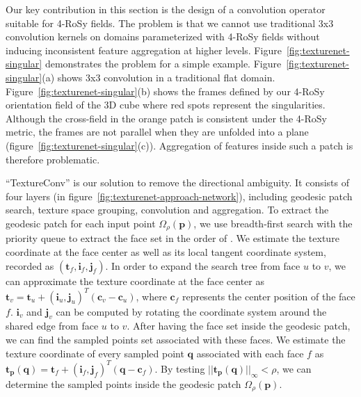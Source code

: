 Our key contribution in this section is the design of a convolution operator suitable for 4-RoSy fields. 
The problem is that we cannot use traditional 3x3 convolution kernels on domains parameterized with 4-RoSy fields without inducing inconsistent feature aggregation at higher levels.  Figure~\ref{fig:texturenet-singular} demonstrates the problem for a simple example.  Figure~\ref{fig:texturenet-singular}(a) shows 3x3 convolution in a traditional flat domain. Figure~\ref{fig:texturenet-singular}(b) shows the frames defined by our 4-RoSy orientation field of the 3D cube where red spots represent the singularities. Although the cross-field in the orange patch is consistent under the 4-RoSy metric, the frames are not parallel when they are unfolded into a plane (figure~\ref{fig:texturenet-singular}(c)). Aggregation of features inside such a patch is therefore problematic.

``TextureConv'' is our solution to remove the directional ambiguity. It consists of four layers (in figure~\ref{fig:texturenet-approach-network}), including geodesic patch search, texture space grouping, convolution and aggregation. To extract the geodesic patch for each input point $\Omega_\rho(\mathbf{p})$, we use breadth-first search with the priority queue to extract the face set in the order of . We estimate the texture coordinate at the face center as well as its local tangent coordinate system, recorded as $(\mathbf{t}_f,\mathbf{i}_f,\mathbf{j}_f)$. In order to expand the search tree from face $u$ to $v$, we can approximate the texture coordinate at the face center as $\mathbf{t}_{v} = \mathbf{t}_{u} + (\mathbf{i}_u,\mathbf{j}_u)^T (\mathbf{c}_v - \mathbf{c}_u)$, where $\mathbf{c}_f$ represents the center position of the face $f$. $\mathbf{i}_v$ and $\mathbf{j}_v$ can be computed by rotating the coordinate system around the shared edge from face $u$ to $v$. After having the face set inside the geodesic patch, we can find the sampled points set associated with these faces. We estimate the texture coordinate of every sampled point $\mathbf{q}$ associated with each face $f$ as $\mathbf{t}_\mathbf{p}(\mathbf{q})=\mathbf{t}_f+(\mathbf{i}_f,\mathbf{j}_f)^T(\mathbf{q} - \mathbf{c}_f)$. By testing $||\mathbf{t}_\mathbf{p}(\mathbf{q})||_\infty < \rho$, we can determine the sampled points inside the geodesic patch $\Omega_\rho(\mathbf{p})$.

